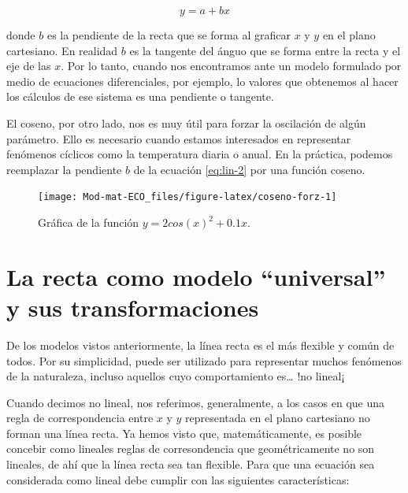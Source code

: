 \documentclass[
]{book}
\begin{document}
\begin{equation}
    y = a + bx \label{eq:lin-2}
\end{equation}

donde \(b\) es la pendiente de la recta que se forma al graficar \(x\) y \(y\) en el plano cartesiano. En realidad \(b\) es la tangente del ánguo que se forma entre la recta y el eje de las \(x\). Por lo tanto, cuando nos encontramos ante un modelo formulado por medio de ecuaciones diferenciales, por ejemplo, lo valores que obtenemos al hacer los cálculos de ese sistema es una pendiente o tangente.

El coseno, por otro lado, nos es muy útil para forzar la oscilación de algún parámetro. Ello es necesario cuando estamos interesados en representar fenómenos cíclicos como la temperatura diaria o anual. En la práctica, podemos reemplazar la pendiente \(b\) de la ecuación \eqref{eq:lin-2} por una función coseno.

\begin{figure}

{\centering \texttt{[image: Mod-mat-ECO\_files/figure-latex/coseno-forz-1]} 

}

\caption{Gráfica de la función $y = 2 cos(x)^2 + 0.1  x$.}\label{fig:coseno-forz}
\end{figure}

\hypertarget{la-recta-como-modelo-universal-y-sus-transformaciones}{%
\section{La recta como modelo ``universal'' y sus transformaciones}\label{la-recta-como-modelo-universal-y-sus-transformaciones}}

De los modelos vistos anteriormente, la línea recta es el más flexible y común de todos. Por su simplicidad, puede ser utilizado para representar muchos fenómenos de la naturaleza, incluso aquellos cuyo comportamiento es\ldots{} !no lineal¡

Cuando decimos no lineal, nos referimos, generalmente, a los casos en que una regla de correspondencia entre \(x\) y \(y\) representada en el plano cartesiano no forman una línea recta. Ya hemos visto que, matemáticamente, es posible concebir como lineales reglas de corresondencia que geométricamente no son lineales, de ahí que la línea recta sea tan flexible. Para que una ecuación sea considerada como lineal debe cumplir con las siguientes características:
\end{document}
